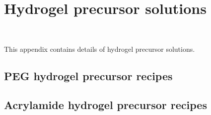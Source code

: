 \chapter{Hydrogel precursor solutions}~\label{appx:precursor-recipes}

This appendix contains details of hydrogel precursor solutions.

\section{PEG hydrogel precursor recipes}

\section{Acrylamide hydrogel precursor recipes}